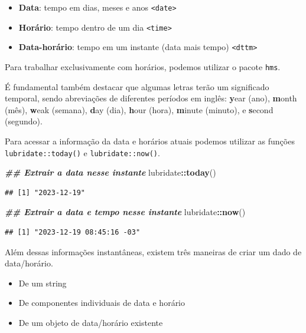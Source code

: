 \documentclass[
]{article}
\newenvironment{Shaded}{\begin{snugshade}}{\end{snugshade}}
\newcommand{\DocumentationTok}[1]{\textcolor[rgb]{0.56,0.35,0.01}{\textbf{\textit{#1}}}}
\newcommand{\FunctionTok}[1]{\textcolor[rgb]{0.13,0.29,0.53}{\textbf{#1}}}
\newcommand{\NormalTok}[1]{#1}
\newcommand{\SpecialCharTok}[1]{\textcolor[rgb]{0.81,0.36,0.00}{\textbf{#1}}}
\providecommand{\tightlist}{%
  \setlength{\itemsep}{0pt}\setlength{\parskip}{0pt}}
\begin{document}
\begin{itemize}
\tightlist
\item
  \textbf{Data}: tempo em dias, meses e anos \texttt{\textless{}date\textgreater{}}
\item
  \textbf{Horário}: tempo dentro de um dia \texttt{\textless{}time\textgreater{}}
\item
  \textbf{Data-horário}: tempo em um instante (data mais tempo) \texttt{\textless{}dttm\textgreater{}}
\end{itemize}

Para trabalhar exclusivamente com horários, podemos utilizar o pacote \texttt{hms}.

É fundamental também destacar que algumas letras terão um significado temporal, sendo abreviações de diferentes períodos em inglês: \textbf{y}ear (ano), \textbf{m}onth (mês), \textbf{w}eak (semana), \textbf{d}ay (dia), \textbf{h}our (hora), \textbf{m}inute (minuto), e \textbf{s}econd (segundo).

Para acessar a informação da data e horários atuais podemos utilizar as funções \texttt{lubridate::today()} e \texttt{lubridate::now()}.

\begin{Shaded}
\begin{Highlighting}[]
\DocumentationTok{\#\# Extrair a data nesse instante}
\NormalTok{lubridate}\SpecialCharTok{::}\FunctionTok{today}\NormalTok{()}
\end{Highlighting}
\end{Shaded}

\begin{verbatim}
## [1] "2023-12-19"
\end{verbatim}

\begin{Shaded}
\begin{Highlighting}[]
\DocumentationTok{\#\# Extrair a data e tempo nesse instante}
\NormalTok{lubridate}\SpecialCharTok{::}\FunctionTok{now}\NormalTok{()}
\end{Highlighting}
\end{Shaded}

\begin{verbatim}
## [1] "2023-12-19 08:45:16 -03"
\end{verbatim}

Além dessas informações instantâneas, existem três maneiras de criar um dado de data/horário.

\begin{itemize}
\tightlist
\item
  De um string
\item
  De componentes individuais de data e horário
\item
  De um objeto de data/horário existente
\end{itemize}
\end{document}
